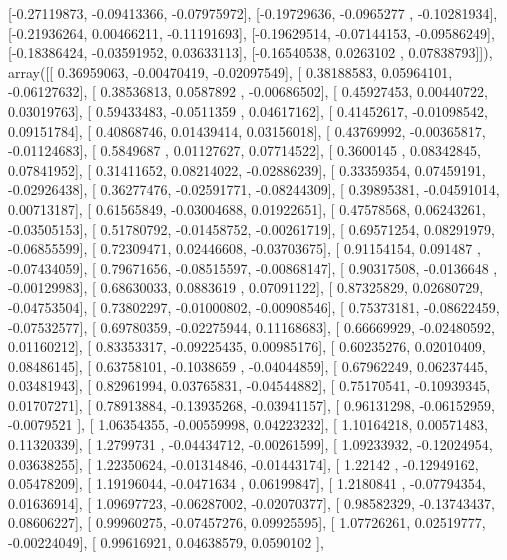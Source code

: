 \documentclass{article}
\begin{document}
       [-0.27119873, -0.09413366, -0.07975972],
       [-0.19729636, -0.0965277 , -0.10281934],
       [-0.21936264,  0.00466211, -0.11191693],
       [-0.19629514, -0.07144153, -0.09586249],
       [-0.18386424, -0.03591952,  0.03633113],
       [-0.16540538,  0.0263102 ,  0.07838793]]), array([[ 0.36959063, -0.00470419, -0.02097549],
       [ 0.38188583,  0.05964101, -0.06127632],
       [ 0.38536813,  0.0587892 , -0.00686502],
       [ 0.45927453,  0.00440722,  0.03019763],
       [ 0.59433483, -0.0511359 ,  0.04617162],
       [ 0.41452617, -0.01098542,  0.09151784],
       [ 0.40868746,  0.01439414,  0.03156018],
       [ 0.43769992, -0.00365817, -0.01124683],
       [ 0.5849687 ,  0.01127627,  0.07714522],
       [ 0.3600145 ,  0.08342845,  0.07841952],
       [ 0.31411652,  0.08214022, -0.02886239],
       [ 0.33359354,  0.07459191, -0.02926438],
       [ 0.36277476, -0.02591771, -0.08244309],
       [ 0.39895381, -0.04591014,  0.00713187],
       [ 0.61565849, -0.03004688,  0.01922651],
       [ 0.47578568,  0.06243261, -0.03505153],
       [ 0.51780792, -0.01458752, -0.00261719],
       [ 0.69571254,  0.08291979, -0.06855599],
       [ 0.72309471,  0.02446608, -0.03703675],
       [ 0.91154154,  0.091487  , -0.07434059],
       [ 0.79671656, -0.08515597, -0.00868147],
       [ 0.90317508, -0.0136648 , -0.00129983],
       [ 0.68630033,  0.0883619 ,  0.07091122],
       [ 0.87325829,  0.02680729, -0.04753504],
       [ 0.73802297, -0.01000802, -0.00908546],
       [ 0.75373181, -0.08622459, -0.07532577],
       [ 0.69780359, -0.02275944,  0.11168683],
       [ 0.66669929, -0.02480592,  0.01160212],
       [ 0.83353317, -0.09225435,  0.00985176],
       [ 0.60235276,  0.02010409,  0.08486145],
       [ 0.63758101, -0.1038659 , -0.04044859],
       [ 0.67962249,  0.06237445,  0.03481943],
       [ 0.82961994,  0.03765831, -0.04544882],
       [ 0.75170541, -0.10939345,  0.01707271],
       [ 0.78913884, -0.13935268, -0.03941157],
       [ 0.96131298, -0.06152959, -0.0079521 ],
       [ 1.06354355, -0.00559998,  0.04223232],
       [ 1.10164218,  0.00571483,  0.11320339],
       [ 1.2799731 , -0.04434712, -0.00261599],
       [ 1.09233932, -0.12024954,  0.03638255],
       [ 1.22350624, -0.01314846, -0.01443174],
       [ 1.22142   , -0.12949162,  0.05478209],
       [ 1.19196044, -0.0471634 ,  0.06199847],
       [ 1.2180841 , -0.07794354,  0.01636914],
       [ 1.09697723, -0.06287002, -0.02070377],
       [ 0.98582329, -0.13743437,  0.08606227],
       [ 0.99960275, -0.07457276,  0.09925595],
       [ 1.07726261,  0.02519777, -0.00224049],
       [ 0.99616921,  0.04638579,  0.0590102 ],
\end{document}
